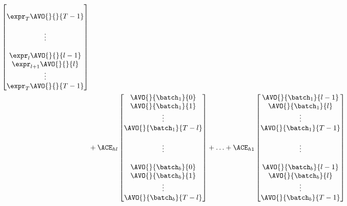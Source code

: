 \begin{equation}
\begin{aligned}
\begin{bmatrix}
            \\
            \expr_{T}\AVO{}{}{T-1}
            \\
            \\
            \vdots
            \\
            \\
            \expr_{l}\AVO{}{}{l-1}
            \\
            \expr_{l+1}\AVO{}{}{l}
            \\
            \vdots
            \\
            \expr_{T}\AVO{}{}{T-1}
        \end{bmatrix}
        \\
        &+ \ACE_{hl}
        \begin{bmatrix}
            \AVO{}{\batch_1}{0}
            \\
            \AVO{}{\batch_1}{1}
            \\
            \vdots
            \\
            \AVO{}{\batch_1}{T-l}
            \\
            \\
            \vdots
            \\
            \\
            \AVO{}{\batch_b}{0}
            \\
            \AVO{}{\batch_b}{1}
            \\
            \vdots
            \\
            \AVO{}{\batch_b}{T-l}
        \end{bmatrix}
        +
        \ldots
        + \ACE_{h1}
        \begin{bmatrix}
            \AVO{}{\batch_1}{l-1}
            \\
            \AVO{}{\batch_1}{l}
            \\
            \vdots
            \\
            \AVO{}{\batch_1}{T-1}
            \\
            \\
            \vdots
            \\
            \\
            \AVO{}{\batch_b}{l-1}
            \\
            \AVO{}{\batch_b}{l}
            \\
            \vdots
            \\
            \AVO{}{\batch_b}{T-1}
        \end{bmatrix}

\end{aligned}
\end{equation}
